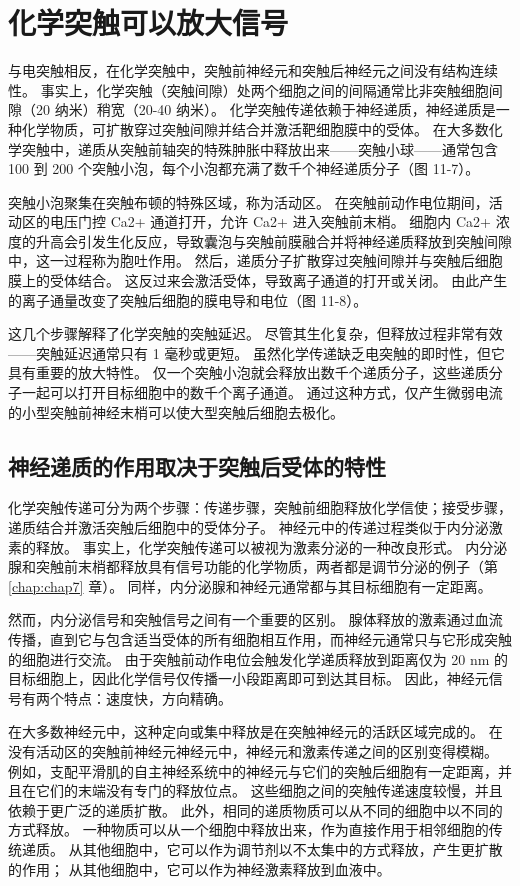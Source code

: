 \section{化学突触可以放大信号}
与电突触相反，在化学突触中，突触前神经元和突触后神经元之间没有结构连续性。 
事实上，化学突触（突触间隙）处两个细胞之间的间隔通常比非突触细胞间隙（20 纳米）稍宽（20-40 纳米）。 
化学突触传递依赖于神经递质，神经递质是一种化学物质，可扩散穿过突触间隙并结合并激活靶细胞膜中的受体。 
在大多数化学突触中，递质从突触前轴突的特殊肿胀中释放出来——突触小球——通常包含 100 到 200 个突触小泡，每个小泡都充满了数千个神经递质分子（图 11-7）。


突触小泡聚集在突触布顿的特殊区域，称为活动区。 
在突触前动作电位期间，活动区的电压门控 Ca2+ 通道打开，允许 Ca2+ 进入突触前末梢。 
细胞内 Ca2+ 浓度的升高会引发生化反应，导致囊泡与突触前膜融合并将神经递质释放到突触间隙中，这一过程称为胞吐作用。 
然后，递质分子扩散穿过突触间隙并与突触后细胞膜上的受体结合。 
这反过来会激活受体，导致离子通道的打开或关闭。 
由此产生的离子通量改变了突触后细胞的膜电导和电位（图 11-8）。


这几个步骤解释了化学突触的突触延迟。 
尽管其生化复杂，但释放过程非常有效——突触延迟通常只有 1 毫秒或更短。 
虽然化学传递缺乏电突触的即时性，但它具有重要的放大特性。 
仅一个突触小泡就会释放出数千个递质分子，这些递质分子一起可以打开目标细胞中的数千个离子通道。 
通过这种方式，仅产生微弱电流的小型突触前神经末梢可以使大型突触后细胞去极化。



\subsection{神经递质的作用取决于突触后受体的特性}
化学突触传递可分为两个步骤：传递步骤，突触前细胞释放化学信使；接受步骤，递质结合并激活突触后细胞中的受体分子。 
神经元中的传递过程类似于内分泌激素的释放。 
事实上，化学突触传递可以被视为激素分泌的一种改良形式。 内分泌腺和突触前末梢都释放具有信号功能的化学物质，两者都是调节分泌的例子（第 \ref{chap:chap7} 章）。 
同样，内分泌腺和神经元通常都与其目标细胞有一定距离。

然而，内分泌信号和突触信号之间有一个重要的区别。 
腺体释放的激素通过血流传播，直到它与包含适当受体的所有细胞相互作用，而神经元通常只与它形成突触的细胞进行交流。 
由于突触前动作电位会触发化学递质释放到距离仅为 20 nm 的目标细胞上，因此化学信号仅传播一小段距离即可到达其目标。 
因此，神经元信号有两个特点：速度快，方向精确。


在大多数神经元中，这种定向或集中释放是在突触神经元的活跃区域完成的。 
在没有活动区的突触前神经元神经元中，神经元和激素传递之间的区别变得模糊。 
例如，支配平滑肌的自主神经系统中的神经元与它们的突触后细胞有一定距离，并且在它们的末端没有专门的释放位点。 
这些细胞之间的突触传递速度较慢，并且依赖于更广泛的递质扩散。 
此外，相同的递质物质可以从不同的细胞中以不同的方式释放。 
一种物质可以从一个细胞中释放出来，作为直接作用于相邻细胞的传统递质。 
从其他细胞中，它可以作为调节剂以不太集中的方式释放，产生更扩散的作用； 
从其他细胞中，它可以作为神经激素释放到血液中。


